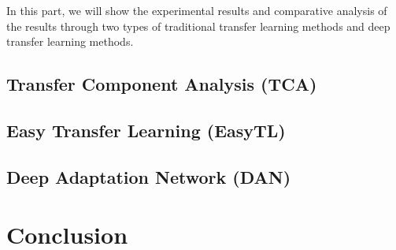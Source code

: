 \documentclass[conference]{IEEEtran}
\begin{document}
In this part, we will show the experimental results and comparative analysis of the results through two types of traditional transfer learning methods and deep transfer learning methods.


\subsection{Transfer Component Analysis (TCA)}



\subsection{Easy Transfer Learning (EasyTL)}


\subsection{Deep Adaptation Network (DAN)}

\section{Conclusion}

\cite{lowe1999object}

\end{document}
